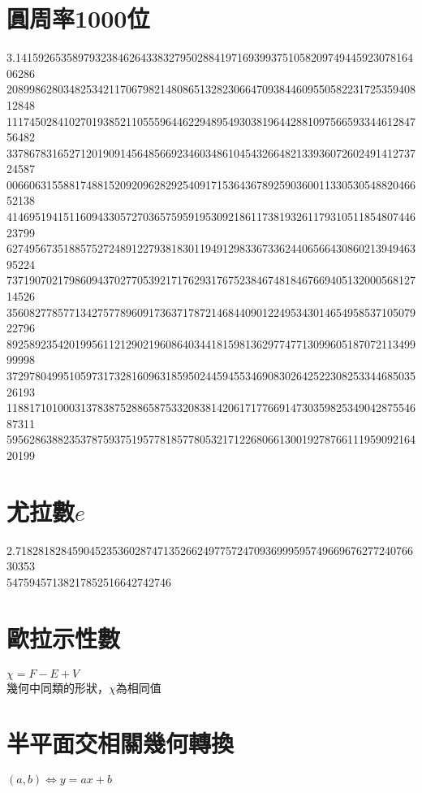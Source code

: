 \section{圓周率1000位}
3.141592653589793238462643383279502884197169399375105820974944592307816406286\\
20899862803482534211706798214808651328230664709384460955058223172535940812848\\
11174502841027019385211055596446229489549303819644288109756659334461284756482\\
33786783165271201909145648566923460348610454326648213393607260249141273724587\\
00660631558817488152092096282925409171536436789259036001133053054882046652138\\
41469519415116094330572703657595919530921861173819326117931051185480744623799\\
62749567351885752724891227938183011949129833673362440656643086021394946395224\\
73719070217986094370277053921717629317675238467481846766940513200056812714526\\
35608277857713427577896091736371787214684409012249534301465495853710507922796\\
89258923542019956112129021960864034418159813629774771309960518707211349999998\\
37297804995105973173281609631859502445945534690830264252230825334468503526193\\
11881710100031378387528865875332083814206171776691473035982534904287554687311\\
59562863882353787593751957781857780532171226806613001927876611195909216420199  

\section{尤拉數$e$}
2.718281828459045235360287471352662497757247093699959574966967627724076630353\\
54759457138217852516642742746

\section{歐拉示性數}
$\chi=F-E+V$\\
幾何中同類的形狀，$\chi$為相同值

\section{半平面交相關幾何轉換}
$(a,b)\Leftrightarrow y=ax+b$

